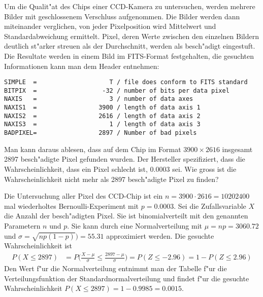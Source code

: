 Um die Qualit"at des Chips einer CCD-Kamera zu untersuchen, werden mehrere
Bilder mit geschlossenem Verschluss aufgenommen.
Die Bilder werden dann miteinander verglichen, von jeder Pixelposition
wird Mittelwert und Standardabweichung ermittelt.
Pixel, deren Werte zwischen den einzelnen Bildern deutlich st"arker streuen
als der Durchschnitt, werden als besch"adigt eingestuft.
Die Resultate werden in einem Bild im FITS-Format festgehalten, die
gesuchten Informationen kann man dem Header entnehmen:
\begin{verbatim}
SIMPLE  =                    T / file does conform to FITS standard
BITPIX  =                  -32 / number of bits per data pixel
NAXIS   =                    3 / number of data axes
NAXIS1  =                 3900 / length of data axis 1
NAXIS2  =                 2616 / length of data axis 2
NAXIS3  =                    1 / length of data axis 3
BADPIXEL=                 2897 / Number of bad pixels  
\end{verbatim}
Man kann daraus ablesen, dass auf dem Chip im Format
$3900\times 2616$ insgesamt 2897 besch"adigte Pixel gefunden wurden.
Der Hersteller spezifiziert, dass die Wahrscheinlichkeit, dass ein Pixel
schlecht ist, $0.0003$ sei.
Wie gross ist die Wahrscheinlichkeit nicht mehr als 2897 besch"adigte Pixel
zu finden?

\begin{loesung}
Die Untersuchung aller Pixel des CCD-Chip ist ein $n=3900\cdot2616=10202400$
mal wiederholtes Bernoulli-Experiment mit $p=0.0003$.
Sei die Zufallsvariable $X$ die Anzahl der besch"adigten Pixel.
Sie ist binomialverteilt mit den genannten Parametern $n$ und $p$.
Sie kann durch eine Normalverteilung mit $\mu = np = 3060.72$
und $\sigma = \sqrt{np(1-p)})=55.31$ approximiert werden.
Die gesuchte Wahrscheinlichkeit ist
\begin{align*}
P(X\le 2897)
&=
P\biggl(
\frac{X-\mu}{\sigma}\le\frac{2897-\mu}{\sigma}
\biggr)
=
P(Z\le -2.96)
=
1-P(Z\le 2.96)
\end{align*}
Den Wert f"ur die Normalverteilung entnimmt man der Tabelle f"ur die
Verteilungsfunktion der Standardnormalverteilung und findet f"ur die
gesuchte Wahrscheinlichkeit
$P(X\le 2897) = 1-0.9985=0.0015$.
\end{loesung}


